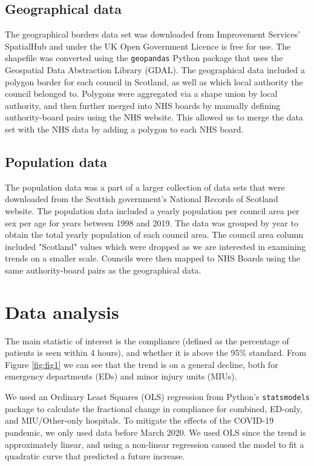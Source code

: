 \documentclass[12pt,a4paper]{article}
\def\code#1{\texttt{#1}}
\begin{document}
\subsection{Geographical data}

The geographical borders data set was downloaded from Improvement Services' SpatialHub and under the UK Open Government Licence is free for use.\cite{geodata} The shapefile was converted using the \code{geopandas} Python package that uses the Geospatial Data Abstraction Library (GDAL). The geographical data included a polygon border for each council in Scotland, as well as which local authority the council belonged to. Polygons were aggregated via a shape union by local authority, and then further merged into NHS boards by manually defining authority-board pairs using the NHS website.\cite{nhs_boards} This allowed us to merge the data set with the NHS data by adding a polygon to each NHS board.

\subsection{Population data}

The population data was a part of a larger collection of data sets that were downloaded from the Scottish government's National Records of Scotland website.\cite{pop_data} The population data included a yearly population per council area per sex per age for years between 1998 and 2019. The data was grouped by year to obtain the total yearly population of each council area. The council area column included "Scotland" values which were dropped as we are interested in examining trends on a smaller scale. Councils were then mapped to NHS Boards using the same authority-board pairs as the geographical data.\cite{nhs_boards}

\section{Data analysis}

The main statistic of interest is the compliance (defined as the percentage of patients is seen within 4 hours), and whether it is above the 95\% standard. From Figure \ref{fig:fig1} we can see that the trend is on a general decline, both for emergency departments (EDs) and minor injury units (MIUs).

We used an Ordinary Least Squares (OLS) regression from Python's \code{statsmodels} package to calculate the fractional change in compliance for combined, ED-only, and MIU/Other-only hospitals. To mitigate the effects of the COVID-19 pandemic, we only used data before March 2020. We used OLS since the trend is approximately linear, and using a non-linear regression caused the model to fit a quadratic curve that predicted a future increase.
\end{document}
